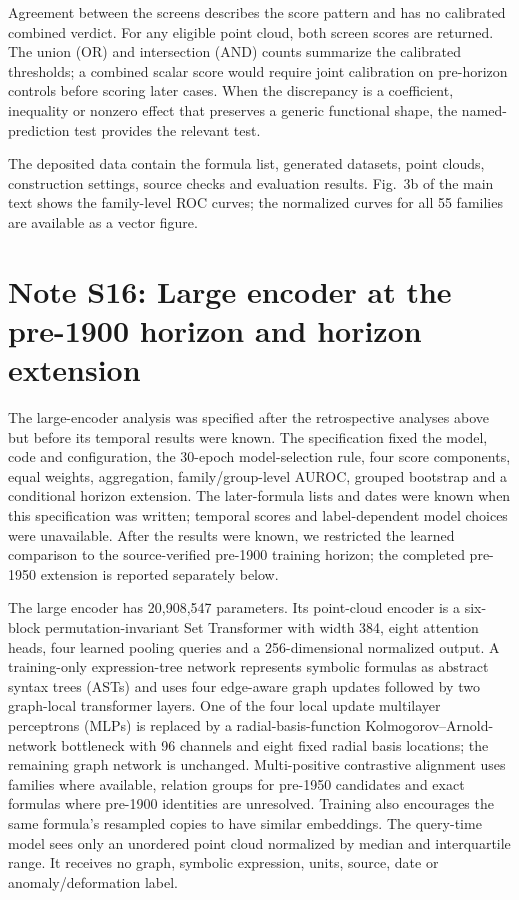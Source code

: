 \documentclass{article}
\begin{document}
Agreement between the screens describes the score pattern and has no calibrated combined verdict. For any eligible point cloud, both screen scores are returned. The union (OR) and intersection (AND) counts summarize the calibrated thresholds; a combined scalar score would require joint calibration on pre-horizon controls before scoring later cases. When the discrepancy is a coefficient, inequality or nonzero effect that preserves a generic functional shape, the named-prediction test provides the relevant test.

The deposited data contain the formula list, generated datasets, point clouds, construction settings, source checks and evaluation results. Fig.~3b of the main text shows the family-level ROC curves; the normalized curves for all 55 families are available as a vector figure.

\section{Note S16: Large encoder at the pre-1900 horizon and horizon extension}

The large-encoder analysis was specified after the retrospective analyses above but before its temporal results were known. The specification fixed the model, code and configuration, the 30-epoch model-selection rule, four score components, equal weights, aggregation, family/group-level AUROC, grouped bootstrap and a conditional horizon extension.  The later-formula lists and dates were known when this specification was written; temporal scores and label-dependent model choices were unavailable. After the results were known, we restricted the learned comparison to the source-verified pre-1900 training horizon; the completed pre-1950 extension is reported separately below.

The large encoder has 20,908,547 parameters. Its point-cloud encoder is a six-block permutation-invariant Set Transformer with width 384, eight attention heads, four learned pooling queries and a 256-dimensional normalized output. A training-only expression-tree network represents symbolic formulas as abstract syntax trees (ASTs) and uses four edge-aware graph updates followed by two graph-local transformer layers. One of the four local update multilayer perceptrons (MLPs) is replaced by a radial-basis-function Kolmogorov--Arnold-network bottleneck with 96 channels and eight fixed radial basis locations; the remaining graph network is unchanged. Multi-positive contrastive alignment uses families where available, relation groups for pre-1950 candidates and exact formulas where pre-1900 identities are unresolved. Training also encourages the same formula's resampled copies to have similar embeddings. The query-time model sees only an unordered point cloud normalized by median and interquartile range. It receives no graph, symbolic expression, units, source, date or anomaly/deformation label.
\end{document}
